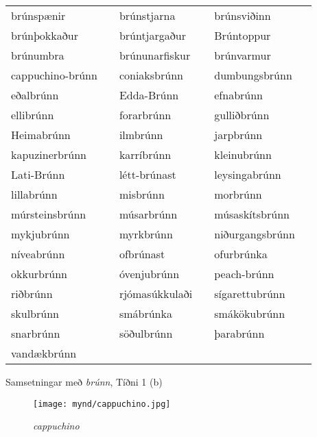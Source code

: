 \documentclass[../samsetningasafn.tex]{subfiles}
\begin{document}
\begin{wordlist}[H]
\begin{tcolorbox}

	\setlength{\extrarowheight}{3pt}
	\begin{tabular}{BlBlBl}			
		brúnspænir		&		& 
		brúnstjarna		&		& 
		brúnsviðinn		&		\\ 
		brúnþokkaður	&		& 
		brúntjargaður	&		& 
		Brúntoppur		&		\\ 
		brúnumbra		&		& 
		brúnunarfiskur	&		& 
		brúnvarmur		&		\\ 
		cappuchino-brúnn &		& 
		coniaksbrúnn	&		& 
		dumbungsbrúnn	&		\\ 
		eðalbrúnn		&		& 
		Edda-Brúnn		&		& 
		efnabrúnn		&		\\ 
		ellibrúnn			&		& 
		forarbrúnn		&		& 
		gulliðbrúnn		&		\\ 
		Heimabrúnn		&		& 
		ilmbrúnn		&		& 
		jarpbrúnn		&		\\ 
		kapuzinerbrúnn	&		& 
		karríbrúnn		&		& 
		kleinubrúnn		&		\\ 
		Lati-Brúnn		&		& 
		létt-brúnast		&		& 
		leysingabrúnn	&		\\ 
		lillabrúnn		&		& 
		misbrúnn		&		& 
		morbrúnn		&		\\ 
		múrsteinsbrúnn	&		& 
		músarbrúnn		&		& 
		músaskítsbrúnn	&		\\ 
		mykjubrúnn		&		& 
		myrkbrúnn		&		& 
		niðurgangsbrúnn &		\\ 
		níveabrúnn		&		& 
		ofbrúnast		&		& 
		ofurbrúnka		&		\\ 
		okkurbrúnn		&		& 
		óvenjubrúnn		& 		& 
		peach-brúnn		&		\\ 
		riðbrúnn			&		& 
		rjómasúkkulaði	&		& 
		sígarettubrúnn	&		\\ 
		skulbrúnn		&		& 
		smábrúnka		&		& 
		smákökubrúnn	&		\\ 
		snarbrúnn		&		& 
		söðulbrúnn		&		& 
		þarabrúnn		&		\\ 
		vandækbrúnn	&		& 
						&		&
						&
	\end{tabular}

\end{tcolorbox}
	\caption{Samsetningar með \textit{brúnn}, Tíðni 1 (b)}
	\label{listi:brunt.1b}
\end{wordlist}	

\begin{figure}[H]
\begin{tcolorbox}
\centering
	\texttt{[image: mynd/cappuchino.jpg]}
\end{tcolorbox}
	\caption{\textit{cappuchino}}
	\label{mynd:cappuchino}
\end{figure}
\end{document}
